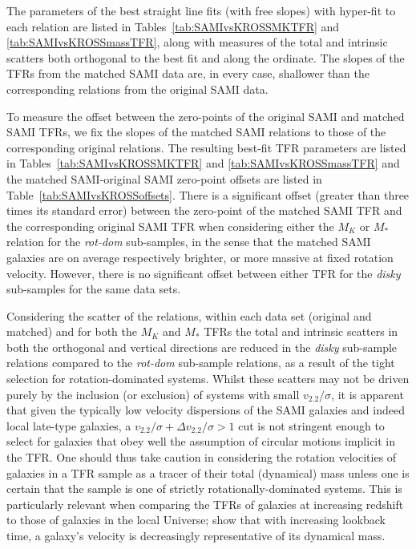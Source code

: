 \documentclass[a4paper,fleqn,usenatbib]{mnras}
\begin{document}
{The parameters of the best straight line fits (with free slopes) with {\sc hyper-fit} to each relation are listed in Tables~\ref{tab:SAMIvsKROSSMKTFR} and \ref{tab:SAMIvsKROSSmassTFR}, along with measures of the total and intrinsic scatters both orthogonal to the best fit and along the ordinate. The slopes of the TFRs from the matched SAMI data are, in every case, shallower than the corresponding relations from the original SAMI data. 

To measure the offset between the zero-points of the original SAMI and matched SAMI TFRs, we fix the slopes of the matched SAMI relations to those of the corresponding original relations. The resulting best-fit TFR parameters are listed in Tables~\ref{tab:SAMIvsKROSSMKTFR} and \ref{tab:SAMIvsKROSSmassTFR} and the matched SAMI-original SAMI zero-point offsets are listed in Table~\ref{tab:SAMIvsKROSSoffsets}. There is a significant offset (greater than three times its standard error) between the zero-point of the matched SAMI TFR and the corresponding original SAMI TFR when considering either the $M_{K}$ or $M_{*}$ relation for the \textit{rot-dom} sub-samples, in the sense that the matched SAMI galaxies are on average respectively brighter, or more massive at fixed rotation velocity. However, there is no significant offset between either TFR for the \textit{disky} sub-samples for the same data sets.

Considering the scatter of the relations, within each data set (original and matched) and for both the $M_{K}$ and $M_{*}$ TFRs the total and intrinsic scatters in both the orthogonal and vertical directions are reduced in the \textit{disky} sub-sample relations compared to the \textit{rot-dom} sub-sample relations, as a result of the tight selection for rotation-dominated systems. Whilst these scatters may not be driven purely by the inclusion (or exclusion) of systems with small $v_{2.2}/\sigma$, it is apparent that given the typically low velocity dispersions of the SAMI galaxies and indeed local late-type galaxies, a $v_{2.2}/\sigma + \Delta v_{2.2}/\sigma >1$ cut is not stringent enough to select for galaxies that obey well the assumption of circular motions implicit in the TFR. One should thus take caution in considering the rotation velocities of galaxies in a TFR sample as a tracer of their total (dynamical) mass unless one is certain that the sample is one of strictly rotationally-dominated systems. This is particularly relevant when comparing the TFRs of galaxies at increasing redshift to those of galaxies in the local Universe; \citet{Turner:2017b} show that with increasing lookback time, a galaxy's velocity is decreasingly representative of its dynamical mass. 

}
\end{document}
